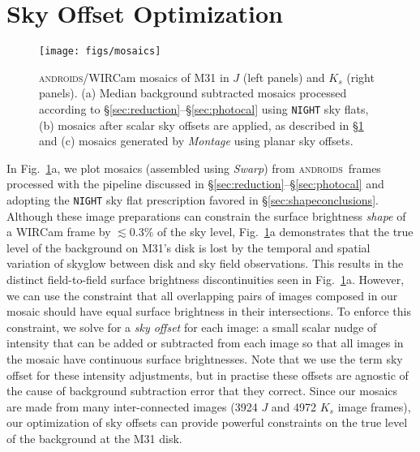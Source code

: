 \documentclass[iop,tighten]{emulateapj}
\newcommand{\sw}[1]{\textit{#1}} %
\newcommand{\androids}{\textsc{androids}}
\newcommand{\Fig}[1]{Fig.~\ref{fig:#1}}  %
\newcommand{\Sec}[1]{\S\ref{sec:#1}}  %
\begin{document}
\section{Sky Offset Optimization}
\label{sec:scalar}

\begin{figure}[t]
\centering
\texttt{[image: figs/mosaics]}
\caption{\androids/WIRCam mosaics of M31 in $J$ (left panels) and $K_s$ (right panels). (a) Median background subtracted mosaics processed according to \Sec{reduction}--\Sec{photocal} using \texttt{NIGHT} sky flats, (b) mosaics after scalar sky offsets are applied, as described in \Sec{scalar} and (c) mosaics generated by \sw{Montage} using planar sky offsets.}
\label{fig:mosaics}
\end{figure}


In \Fig{mosaics}a, we plot mosaics (assembled using \sw{Swarp}) from \androids\ frames processed with the pipeline discussed in \Sec{reduction}--\Sec{photocal} and adopting the \texttt{NIGHT} sky flat prescription favored in \Sec{shapeconclusions}.
Although these image preparations can constrain the surface brightness \emph{shape} of a WIRCam frame by $\lesssim 0.3\%$ of the sky level, \Fig{mosaics}a demonstrates that the true level of the background on M31's disk is lost by the temporal and spatial variation of skyglow between disk and sky field observations.
This results in the distinct field-to-field surface brightness discontinuities seen in \Fig{mosaics}a.
However, we can use the constraint that all overlapping pairs of images composed in our mosaic should have equal surface brightness in their intersections.
To enforce this constraint, we solve for a \emph{sky offset} for each image: a small scalar nudge of intensity that can be added or subtracted from each image so that all images in the mosaic have continuous surface brightnesses.
Note that we use the term sky offset for these intensity adjustments, but in practise these offsets are agnostic of the cause of background subtraction error that they correct.
Since our mosaics are made from many inter-connected images (3924 $J$ and 4972 $K_s$ image frames), our optimization of sky offsets can provide powerful constraints on the true level of the background at the M31 disk.
\end{document}

